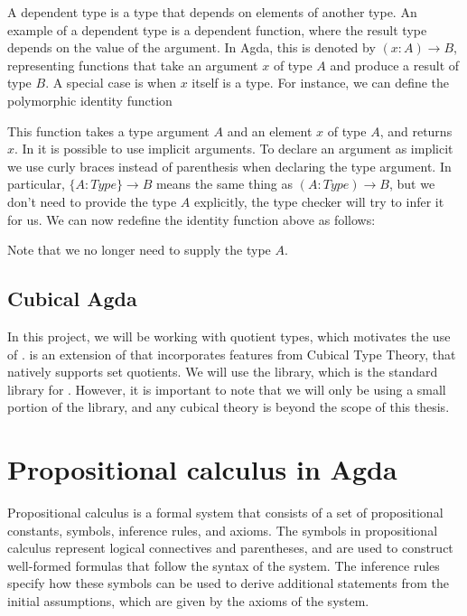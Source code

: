 \documentclass[titlepage]{article}
\begin{document}
A dependent type is a type that depends on elements of another type. An example of a dependent type is a dependent function, where the result type depends on the value of the argument.  In Agda, this is denoted by $(x : A) \to B$, representing functions that take an argument $x$ of type $A$ and produce a result of type $B$. A special case is when $x$ itself is a type. For instance, we can define the polymorphic identity function

This function takes a type argument $A$ and an element $x$ of type $A$, and returns $x$. In \Agda it is possible to use implicit arguments. To declare an argument as implicit we use curly braces instead of parenthesis when declaring the type argument. In particular, $\{A : Type\} \to B$ means the same thing as $(A : Type) \to B$, but we don't need to provide the type $A$ explicitly, the type checker will try to infer it for us. We can now redefine the identity function above as follows:

Note that we no longer need to supply the type $A$.


\subsection{Cubical Agda}

In this project, we will be working with quotient types, which motivates the use of \CubicalAgda\cite{VMA_2021}. \CubicalAgda is an extension of \Agda that incorporates features from Cubical Type Theory, that natively supports set quotients\cite{AgdaDoc}. We will use the \agdaCubical library, which is the standard library for \CubicalAgda. However, it is important to note that we will only be using a small portion of the \agdaCubical library, and any cubical theory is beyond the scope of this thesis.




\section{Propositional calculus in Agda}

Propositional calculus is a formal system that consists of a set of propositional constants, symbols, inference rules, and axioms. The symbols in propositional calculus represent logical connectives and parentheses, and are used to construct well-formed formulas that follow the syntax of the system. The inference rules specify how these symbols can be used to derive additional statements from the initial assumptions, which are given by the axioms of the system. 
\end{document}
